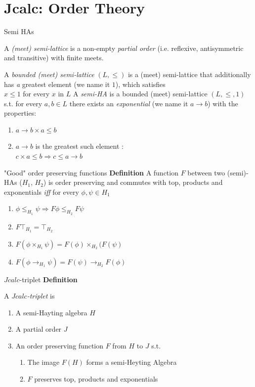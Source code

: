 \documentclass{beamer}
\begin{document}
\section{Jcalc: Order Theory}
\begin{frame}{Semi HAs}
  \begin{outline}
  \1[*] A \textit{(meet) semi-lattice} is a non-empty \emph{partial order} 
  (i.e. reflexive, antisymmetric and transitive) 
  with finite meets.
  
 \1[*]
  A \textit{bounded (meet) semi-lattice} $(L,\le)$ is a (meet) 
  semi-lattice that additionally has 
  \2 \emph a {greatest element} (we name it $1$), which satisfies\\
  $x \le 1$ for every $x$ in $L$  
 \1 A \textit{semi-HA} is a bounded (meet) semi-lattice $(L,\le, 1)$ 
 s.t. for every $a,b\in L$ there exists an \textit{exponential} 
 (we name it $a\rightarrow b$) 
 with the properties: 
 \begin{enumerate}
 \item $a\rightarrow b\times a\le b $
 \item $a\rightarrow b$ is the greatest such element : \\ $c\times a\le b \Longrightarrow c\le a\rightarrow b $
 \end{enumerate}
  \end{outline}
\end{frame}
\begin{frame}{"Good" order preserving functions}
  \textbf{Definition}
  A function $F$ between two (semi)-HAs ($H_1$, $H_2$)
   is order preserving
  and commutes with top, products and exponentials \emph{iff} for every 
  $\phi,\psi \in H_1$
    \begin{enumerate}
    \item $\phi\le_{H_1}\psi\Rightarrow F\phi\le_{H_2}F\psi$
    \item $F\top_{H_1} = \top_{H_2}$ 
    \item{$F(\phi \times_{H_1}\psi) = F(\phi)\times_{H_2}(F(\psi)$} 
    \item $F(\phi\rightarrow_{H_1} \psi) = F(\psi)\rightarrow_{H_2} F(\phi)$
    \end{enumerate}    
  \end{frame}
 \begin{frame}{$Jcalc$-triplet}
  \textbf{Definition}
  
    A \emph{$Jcalc$-triplet} is 
    
  \begin{enumerate}
  \item A semi-Hayting algebra $H$
  \item A partial order $J$
  \item An order preserving function $F$ from $H$ to $J$ s.t.
  \begin{enumerate}
    \item The image $F(H)$ forms a semi-Heyting Algebra
    \item $F$ preserves top, products and exponentials
  \end{enumerate}
  \end{enumerate}
\end{frame}
\end{document}
